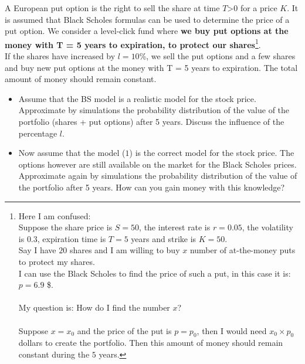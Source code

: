 \documentclass[11pt]{report}
\begin{document}
A European put option is the right to sell the share at time $T$>$0$ for a price $K$. It is assumed that Black Scholes formulas can be used to determine the price of a put option. 
We consider a level-click fund where \textbf{we buy put options at the money with T = 5 years to expiration, to protect our shares}\footnote{Here I am confused:\\
Suppose the share price is $S = 50$, the interest rate is $r = 0.05$, the volatility is $0.3$, expiration time is $T = 5$ years and strike is $K = 50$. \\Say I have $20$ shares and I am willing to buy $x$ number of at-the-money puts to protect my shares. \\I can use the Black Scholes to find the price of such a put, in this case it is: $p = 6.9$ \$.\\\\
My question is: How do I find the number $x$?\\\\
Suppose $x = x_0$ and the price of the put is $p = p_0$, then I would need $x_0 \times p_0$ dollars to create the portfolio. Then this amount of money should remain constant during the $5$ years.
}.
\\
If the shares have increased by $l = 10$\%, we sell the put options and a few shares and buy new put options at the money with T = 5 years to expiration. The total amount of money should remain constant.

\begin{itemize}
\item
Assume that the BS model is a realistic model for the stock price. Approximate by simulations the probability distribution of the value of the portfolio (shares + put options) after 5 years. Discuss the influence of the percentage $l$.
\item
Now assume that the model ($1$) is the correct model for the stock price. The options however are still available on the market for the Black Scholes prices. Approximate again by simulations the probability distribution of the value of the portfolio after 5 years. How can you gain money with this knowledge?
\end{itemize}
\end{document}
